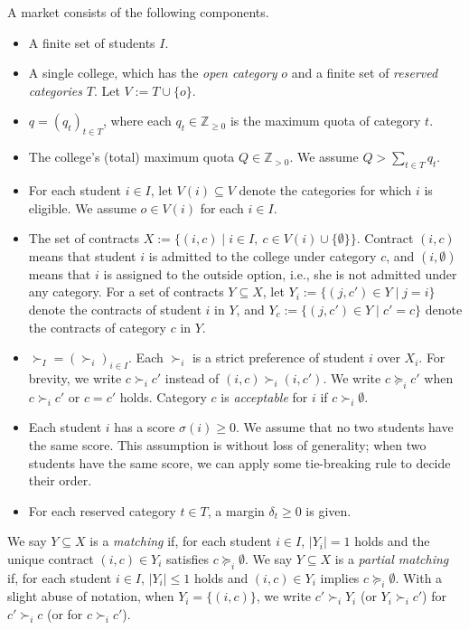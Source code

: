 \documentclass[a4paper,twoside]{article}
\theoremstyle{definition}
\begin{document}
A market consists of the following components.
\begin{itemize}
\item A finite set of students $I$.
\item A single college, which has the \emph{open category} $o$ and a finite set of
\emph{reserved categories} $T$. Let $V:=T\cup\{o\}$.
\item $q=(q_t)_{t\in T}$, where each $q_t\in\mathbb{Z}_{\ge 0}$ is the maximum quota of 
category $t$. 
\item The college's (total) maximum quota $Q \in\mathbb{Z}_{> 0}$. We assume $Q > \sum_{t \in T} q_t$. 
\item For each student $i\in I$, let 
$V(i)\subseteq V$ denote the categories for which $i$ is eligible. 
We assume $o\in V(i)$ for each $i\in I$.
\item The set of contracts
$X:=\{(i,c)\mid i\in I,\ c\in V(i)\cup\{\emptyset\}\}$.
Contract $(i,c)$ means that student $i$ is admitted to the college under
category $c$, and $(i,\emptyset)$ means that $i$ is assigned to the outside option,
i.e., she is not admitted under any category. 
For a set of contracts $Y\subseteq X$,
let $Y_i:=\{(j,c')\in Y \mid j=i\}$ denote the contracts of student $i$ in $Y$, 
and $Y_c:=\{(j,c')\in Y \mid c'=c\}$ denote the contracts of category $c$ in $Y$.

\item $\succ_I=(\succ_i)_{i\in I}$. 
Each $\succ_i$ is a strict preference of student $i$
over $X_i$. 
For brevity, we write $c \succ_i c'$ 
instead of $(i,c)\succ_i (i,c')$. We write $c \succeq_i c'$ 
when $c \succ_i c'$ or $c=c'$ holds. 
Category $c$ is \emph{acceptable} for $i$ if $c\succ_i\emptyset$.
\item Each student $i$ has a score $\sigma(i)\ge 0$. We assume that no two students
have the same score. 
This assumption is without loss of 
generality; when two students 
have the same score, we can apply some tie-breaking rule to decide their order. 
\item For each reserved category $t\in T$, a margin $\delta_t\ge 0$ is given.
\end{itemize}
We say $Y\subseteq X$ is a \emph{matching} if, for each student $i\in I$, $|Y_i|=1$
holds and the unique contract $(i,c)\in Y_i$ satisfies $c\succeq_i\emptyset$.
We say $Y\subseteq X$ is a \emph{partial matching} if, for each student $i\in I$,
$|Y_i|\le 1$ holds and $(i,c)\in Y_i$ implies $c\succeq_i\emptyset$.
With a slight abuse of notation, when $Y_i=\{(i,c)\}$, we write $c'\succ_i Y_i$ (or $Y_i \succ_i c'$)
for $c'\succ_i c$ (or for $c \succ_i c'$). 
\end{document}
